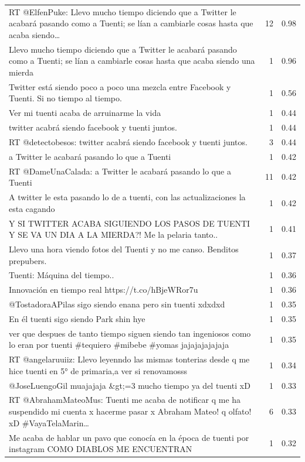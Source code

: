 \begin{longtable}{p{12.5cm}rr}
\bottomrule
\endlastfoot
RT @ElfenPuke: Llevo mucho tiempo diciendo que a Twitter le acabará pasando como a Tuenti; se lían a cambiarle cosas hasta que acaba siendo… & 12 & 0.98 \\
Llevo mucho tiempo diciendo que a Twitter le acabará pasando como a Tuenti; se lían a cambiarle cosas hasta que acaba siendo una mierda & 1 & 0.96 \\
Twitter está siendo poco a poco una mezcla entre Facebook y Tuenti. Si no tiempo al tiempo. & 1 & 0.56 \\
Ver mi tuenti acaba de arruinarme la vida & 1 & 0.44 \\
twitter acabrá siendo facebook y tuenti juntos. & 1 & 0.44 \\
RT @detectobesos: twitter acabrá siendo facebook y tuenti juntos. & 3 & 0.44 \\
a Twitter le acabará pasando lo que a Tuenti & 1 & 0.42 \\
RT @DameUnaCalada: a Twitter le acabará pasando lo que a Tuenti & 11 & 0.42 \\
A twitter le esta pasando lo de a tuenti, con las actualizaciones la esta cagando & 1 & 0.42 \\
Y SI TWITTER ACABA SIGUIENDO LOS PASOS DE TUENTI Y SE VA UN DIA A LA MIERDA?! Me la pelaria tanto.. & 1 & 0.41 \\
Llevo una hora viendo fotos del Tuenti y no me canso. Benditos prepubers. & 1 & 0.37 \\
Tuenti: Máquina del tiempo.. & 1 & 0.36 \\
Innovación en tiempo real  https://t.co/hBjeWRor7u & 1 & 0.36 \\
@TostadoraAPilas sigo siendo enana pero sin tuenti xdxdxd & 1 & 0.35 \\
En él tuenti sigo siendo Park shin hye & 1 & 0.35 \\
ver que despues de tanto tiempo siguen siendo tan ingeniosos como lo eran por tuenti \#tequiero \#mibebe \#yomas jajajajajajaja & 1 & 0.35 \\
RT @angelaruuiiz: Llevo leyenndo las mismas tonterias desde q me hice tuenti en 5° de primaria,a ver si renovamosss & 1 & 0.34 \\
@JoseLuengoGil muajajaja \&gt;=3 mucho tiempo ya del tuenti xD & 1 & 0.33 \\
RT @AbrahamMateoMus: Tuenti me acaba de notificar q me ha suspendido mi cuenta x hacerme pasar x Abraham Mateo! q olfato! xD \#VayaTelaMarin… & 6 & 0.33 \\
Me acaba de hablar un pavo que conocía en la época de tuenti por instagram COMO DIABLOS ME ENCUENTRAN & 1 & 0.32 \\

\end{longtable}
\clearpage

